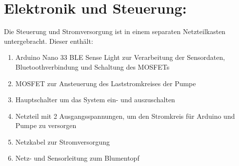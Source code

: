 \section{Elektronik und Steuerung:}
Die Steuerung und Stromversorgung ist in einem separaten Netzteilkasten untergebracht. Dieser enthält:
\begin{enumerate}
	\item Arduino Nano 33 BLE Sense Light zur Verarbeitung der Sensordaten, Bluetoothverbindung und Schaltung des MOSFETs
	\item MOSFET zur Ansteuerung des Laststromkreises der Pumpe
	\item Hauptschalter um das System ein- und auszuschalten
	\item Netzteil mit 2 Ausgangsspannungen, um den Stromkreis für Arduino und Pumpe zu versorgen
	\item Netzkabel zur Stromversorgung
	\item Netz- und Sensorleitung zum Blumentopf
\end{enumerate}
